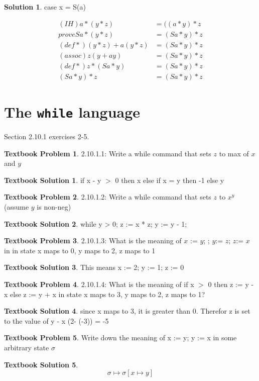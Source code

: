 \documentclass[10pt]{article}
\theoremstyle{definition}
\newtheorem{sol}{Solution}
\newtheorem{bp}{Textbook Problem}
\newtheorem{ts}{Textbook Solution}
\begin{document}
\begin{sol}

case x = S(a)

\begin{align*}
(IH) a * (y * z) &= ((a * y) * z \\
prove  Sa * (y * z) &= (Sa * y) * z \\
(def *) (y*z) + a (y*z) &= (Sa * y) * z \\
(assoc) z(y + ay) &= (Sa * y) * z\\
(def *)  z * (Sa * y) &= (Sa * y) * z \\
(Sa * y) * z &= (Sa * y) * z
\end{align*}

\end{sol}

\section*{The \texttt{while} language}

Section 2.10.1 exercises 2-5.


\begin{bp}
2.10.1.1: Write a while command that sets $z$ to max of $x$ and $y$
\end{bp}


\begin{ts}
if x - y $>$ 0 then x else if x = y then -1 else y
\end{ts}


\begin{bp}
2.10.1.2: Write a while command that sets $z$ to $x^y$ (assume $y$ is non-neg)
\end{bp}


\begin{ts}
while y > 0;
	z := x * z;
	y := y - 1;
\end{ts}


\begin{bp}
2.10.1.3: What is the meaning of $x$ := $y$; ; $y$:= $z$; $z$:= $x$ in in state { x maps to 0, y maps to 2, z maps to 1}
\end{bp}


\begin{ts}
This means
x := 2;
y := 1;
z := 0
\end{ts}


\begin{bp}
2.10.1.4: What is the meaning of if x $>$ 0 then z := y - x else z := y + x in state {x maps to 3, y maps to 2, z maps to 1}?
\end{bp}


\begin{ts}
since x maps to 3, it is greater than 0. Therefor z is set to the value of y - x (2- (-3)) = -5
\end{ts}


\begin{bp}
Write down the meaning of x := y; y := x in some arbitrary state $ \sigma $
\end{bp}


\begin{ts}
\begin{equation}
\sigma \mapsto \sigma [ x \mapsto y]
\end{equation}
\end{ts}
\end{document}
